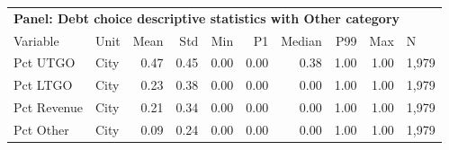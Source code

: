 \begin{table}[H]
\centering
\begin{tabular*}{\textwidth}{@{\extracolsep{\fill}}llrrrrrrrl}
\multicolumn{10}{l}{\textbf{Panel: Debt choice descriptive statistics with Other category}}\\

\addlinespace
  \toprule
Variable & Unit & Mean & Std & Min & P1 & Median & P99 & Max & N \\ 
  \hline
Pct UTGO & City & 0.47 & 0.45 & 0.00 & 0.00 & 0.38 & 1.00 & 1.00 & 1,979 \\ 
  Pct LTGO & City & 0.23 & 0.38 & 0.00 & 0.00 & 0.00 & 1.00 & 1.00 & 1,979 \\ 
  Pct Revenue & City & 0.21 & 0.34 & 0.00 & 0.00 & 0.00 & 1.00 & 1.00 & 1,979 \\ 
  Pct Other & City & 0.09 & 0.24 & 0.00 & 0.00 & 0.00 & 1.00 & 1.00 & 1,979 \\ 
   \hline
\end{tabular*}
\end{table}
